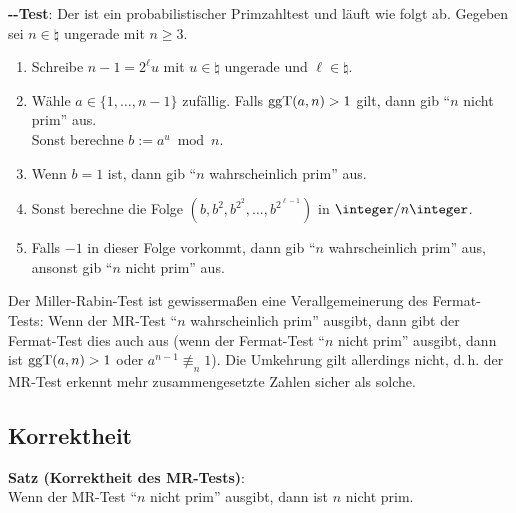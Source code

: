 \textbf{--Test}:
Der  ist ein probabilistischer Primzahltest
und läuft wie folgt ab.
Gegeben sei $n \in \natural$ ungerade mit $n \ge 3$.
\begin{enumerate}
    \item
    Schreibe $n - 1 = 2^\ell u$ mit $u \in \natural$ ungerade und $\ell \in \natural$.

    \item
    Wähle $a \in \{1, \dotsc, n - 1\}$ zufällig.
    Falls $\operatorname{ggT}(a, n) > 1$ gilt, dann gib "`$n$ nicht prim"' aus.\\
    Sonst berechne $b := a^u \bmod n$.

    \item
    Wenn $b = 1$ ist, dann gib "`$n$ wahrscheinlich prim"' aus.

    \item
    Sonst berechne die Folge $(b, b^2, b^{2^2}, \dotsc, b^{2^{\ell-1}})$ in $\ZnZ$.

    \item
    Falls $-1$ in dieser Folge vorkommt, dann gib "`$n$ wahrscheinlich prim"' aus,
    ansonst gib "`$n$ nicht prim"' aus.
\end{enumerate}
Der Miller-Rabin-Test ist gewissermaßen eine Verallgemeinerung des Fermat-Tests:
Wenn der MR-Test "`$n$ wahrscheinlich prim"' ausgibt, dann gibt der Fermat-Test dies auch aus
(wenn der Fermat-Test "`$n$ nicht prim"' ausgibt, dann ist $\operatorname{ggT}(a, n) > 1$ oder
$a^{n-1} \not\equiv_n 1$).
Die Umkehrung gilt allerdings nicht,
d.\,h. der MR-Test erkennt mehr zusammengesetzte Zahlen sicher als solche.

\pagebreak

\subsection{%
    Korrektheit%
}

\textbf{Satz (Korrektheit des MR-Tests)}:\\
Wenn der MR-Test "`$n$ nicht prim"' ausgibt, dann ist $n$ nicht prim.

